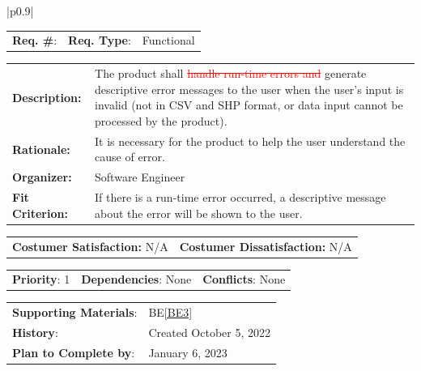 \documentclass[12pt, titlepage]{article}
\newcommand{\beref}[1]{BE\ref{#1}}
\newcounter{reqnum}
\newcommand{\reqthereqnum}{\textbf{Req. \#}: \thereqnum}
\newenvironment{boxed}
    {\begin{center}
    \begin{tabular}{|p{0.9\textwidth}|}
    \hline\\
    }
    { 
    \\\\\hline
    \end{tabular} 
    \end{center}
    }
\begin{document}
\begin{boxed}
\begin{tabular}{l r r}
{reqnum} \reqthereqnum \label{Req10} & {\bf Req. Type}: &  Functional\\
\end{tabular}
\newline
\begin{tabular}{l p{11.5cm}}
     {\bf Description:} & The product shall \textcolor{red}{\sout{handle run-time errors and}} generate descriptive error messages to the user when the user's input is invalid (not in CSV and SHP format, or data input cannot be processed by the product).  \\
    {\bf Rationale:} & It is necessary for the product to help the user understand the cause of error.\\
    {\bf Organizer:} & Software Engineer\\
    {\bf Fit Criterion:} & If there is a run-time error occurred, a descriptive message about the error will be shown to the user.\\
\end{tabular}
\begin{tabular}{l r}
{\bf Costumer Satisfaction:} N/A &  {\bf Costumer Dissatisfaction:}  N/A\\
\end{tabular}
\begin{tabular}{l r r}
    {\bf Priority}: 1 & {\bf Dependencies}: None  & {\bf Conflicts}: None \\
\end{tabular}
\begin{tabular}{l l}
     {\bf Supporting Materials}:& 
     \beref{BE3} \\ 
     {\bf History}: & Created October 5, 2022\\
     {\bf Plan to Complete by}: & January 6, 2023\\
\end{tabular}
\end{boxed}
\end{document}
